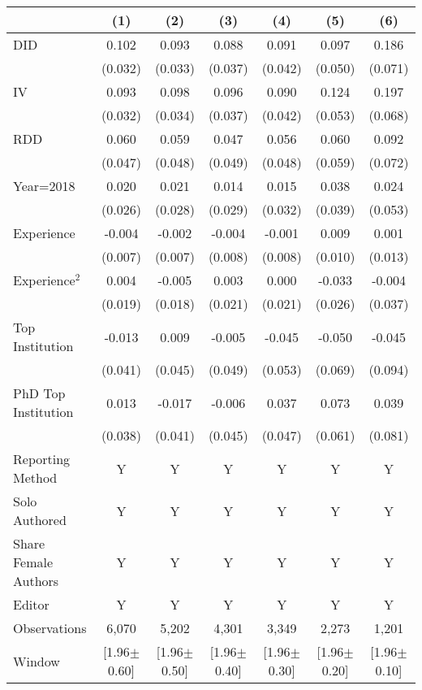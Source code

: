 \begin{tabular}{l*{6}{c}}
\hline\hline
                &\multicolumn{1}{c}{(1)}&\multicolumn{1}{c}{(2)}&\multicolumn{1}{c}{(3)}&\multicolumn{1}{c}{(4)}&\multicolumn{1}{c}{(5)}&\multicolumn{1}{c}{(6)}\\
\hline
DID             &    0.102&    0.093&    0.088&    0.091&    0.097&    0.186\\
                &  (0.032)&  (0.033)&  (0.037)&  (0.042)&  (0.050)&  (0.071)\\
IV              &    0.093&    0.098&    0.096&    0.090&    0.124&    0.197\\
                &  (0.032)&  (0.034)&  (0.037)&  (0.042)&  (0.053)&  (0.068)\\
RDD             &    0.060&    0.059&    0.047&    0.056&    0.060&    0.092\\
                &  (0.047)&  (0.048)&  (0.049)&  (0.048)&  (0.059)&  (0.072)\\
Year=2018       &    0.020&    0.021&    0.014&    0.015&    0.038&    0.024\\
                &  (0.026)&  (0.028)&  (0.029)&  (0.032)&  (0.039)&  (0.053)\\
Experience      &   -0.004&   -0.002&   -0.004&   -0.001&    0.009&    0.001\\
                &  (0.007)&  (0.007)&  (0.008)&  (0.008)&  (0.010)&  (0.013)\\
Experience$^2$  &    0.004&   -0.005&    0.003&    0.000&   -0.033&   -0.004\\
                &  (0.019)&  (0.018)&  (0.021)&  (0.021)&  (0.026)&  (0.037)\\
Top Institution &   -0.013&    0.009&   -0.005&   -0.045&   -0.050&   -0.045\\
                &  (0.041)&  (0.045)&  (0.049)&  (0.053)&  (0.069)&  (0.094)\\
PhD Top Institution&    0.013&   -0.017&   -0.006&    0.037&    0.073&    0.039\\
                &  (0.038)&  (0.041)&  (0.045)&  (0.047)&  (0.061)&  (0.081)\\
Reporting Method &        Y&        Y&        Y&        Y&        Y&        Y\\
Solo Authored   &        Y&        Y&        Y&        Y&        Y&        Y\\
Share Female Authors &        Y&        Y&        Y&        Y&        Y&        Y\\
Editor          &        Y&        Y&        Y&        Y&        Y&        Y\\
\hline
Observations    &    6,070&    5,202&    4,301&    3,349&    2,273&    1,201\\
Window          &[1.96$\pm$0.60]&[1.96$\pm$0.50]&[1.96$\pm$0.40]&[1.96$\pm$0.30]&[1.96$\pm$0.20]&[1.96$\pm$0.10]\\
\hline\hline
\end{tabular}
